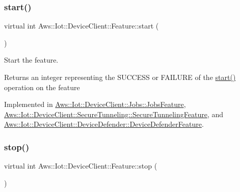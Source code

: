 \mbox{\label{class_aws_1_1_iot_1_1_device_client_1_1_feature_ac9a936ebd88f7e35914a6aac99badf7d}} 
\subsubsection{\texorpdfstring{start()}{start()}}
{\footnotesize\ttfamily virtual int Aws\+::\+Iot\+::\+Device\+Client\+::\+Feature\+::start (\begin{DoxyParamCaption}{ }\end{DoxyParamCaption})\hspace{0.3cm}{\ttfamily [pure virtual]}}



Start the feature. 

\begin{DoxyReturn}{Returns}
an integer representing the S\+U\+C\+C\+E\+SS or F\+A\+I\+L\+U\+RE of the \hyperlink{class_aws_1_1_iot_1_1_device_client_1_1_feature_ac9a936ebd88f7e35914a6aac99badf7d}{start()} operation on the feature 
\end{DoxyReturn}


Implemented in \hyperlink{class_aws_1_1_iot_1_1_device_client_1_1_jobs_1_1_jobs_feature_a6369b1914ce964ca98c9474a38e3214f}{Aws\+::\+Iot\+::\+Device\+Client\+::\+Jobs\+::\+Jobs\+Feature}, \hyperlink{class_aws_1_1_iot_1_1_device_client_1_1_secure_tunneling_1_1_secure_tunneling_feature_a9e33fc786883e519e587f7d89f2a9086}{Aws\+::\+Iot\+::\+Device\+Client\+::\+Secure\+Tunneling\+::\+Secure\+Tunneling\+Feature}, and \hyperlink{class_aws_1_1_iot_1_1_device_client_1_1_device_defender_1_1_device_defender_feature_aeede868840f237a50d394c779a8a9026}{Aws\+::\+Iot\+::\+Device\+Client\+::\+Device\+Defender\+::\+Device\+Defender\+Feature}.

\mbox{\label{class_aws_1_1_iot_1_1_device_client_1_1_feature_a5b672f7b1403512cad9104ba923fc73d}} 
\subsubsection{\texorpdfstring{stop()}{stop()}}
{\footnotesize\ttfamily virtual int Aws\+::\+Iot\+::\+Device\+Client\+::\+Feature\+::stop (\begin{DoxyParamCaption}{ }\end{DoxyParamCaption})\hspace{0.3cm}{\ttfamily [pure virtual]}}



